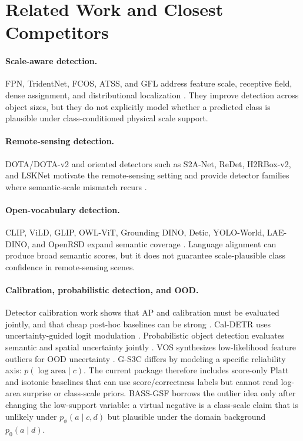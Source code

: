 \documentclass[10pt]{article}
\newcommand{\logarea}{\log \mathrm{area}}
\begin{document}
\section{Related Work and Closest Competitors}

\paragraph{Scale-aware detection.}
FPN, TridentNet, FCOS, ATSS, and GFL address feature scale, receptive field,
dense assignment, and distributional localization
\cite{lin2016fpn,li2019tridentnet,tian2019fcos,zhang2019atss,li2020gfl}.
They improve detection across object sizes, but they do not explicitly model
whether a predicted class is plausible under class-conditioned physical scale
support.

\paragraph{Remote-sensing detection.}
DOTA/DOTA-v2 and oriented detectors such as S2A-Net, ReDet, H2RBox-v2, and
LSKNet motivate the remote-sensing setting and provide detector families where
semantic-scale mismatch recurs
\cite{xia2017dota,ding2021dotav2,han2020s2anet,han2021redet,yu2023h2rboxv2,li2024lsknet}.

\paragraph{Open-vocabulary detection.}
CLIP, ViLD, GLIP, OWL-ViT, Grounding DINO, Detic, YOLO-World, LAE-DINO, and
OpenRSD expand semantic coverage
\cite{radford2021clip,gu2021vild,li2021glip,minderer2022owlvit,liu2023groundingdino,zhou2022detic,cheng2024yoloworld,pan2024laedino,huang2025openrsd}.
Language alignment can produce broad semantic scores, but it does not guarantee
scale-plausible class confidence in remote-sensing scenes.

\paragraph{Calibration, probabilistic detection, and OOD.}
Detector calibration work shows that AP and calibration must be evaluated
jointly, and that cheap post-hoc baselines can be strong
\cite{kuzucu2024detcalib}.  Cal-DETR uses uncertainty-guided logit modulation
\cite{munir2023caldetr}.  Probabilistic object detection evaluates semantic and
spatial uncertainty jointly \cite{hall2018probod}.  VOS synthesizes
low-likelihood feature outliers for OOD uncertainty \cite{du2022vos}.  G-S3C
differs by modeling a specific reliability axis: $p(\logarea\mid c)$.  The
current package therefore includes score-only Platt and isotonic baselines that
can use score/correctness labels but cannot read log-area surprise or
class-scale priors.  BASS-GSF borrows the outlier idea only after changing the
low-support variable: a virtual negative is a class-scale claim that is unlikely
under $p_\phi(a\mid c,d)$ but plausible under the domain background
$p_0(a\mid d)$.
\end{document}
